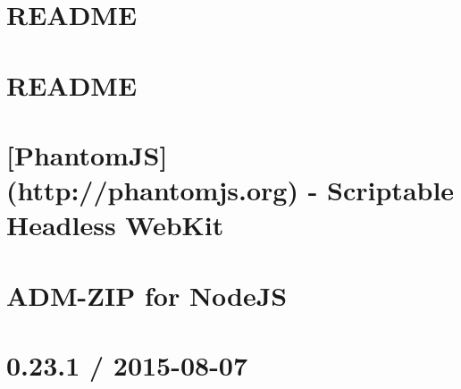 \documentclass[twoside]{book}
\newcommand{\+}{\discretionary{\mbox{\scriptsize$\hookleftarrow$}}{}{}}
\begin{document}
\chapter{R\+E\+A\+D\+M\+E}
\label{md__c_1__users_martin__documents__git_hub_visual_studio__bachelor__wis_r__wis_r_node_modules_gru958568592336ac393a766e6d11e1456e}
\hypertarget{md__c_1__users_martin__documents__git_hub_visual_studio__bachelor__wis_r__wis_r_node_modules_gru958568592336ac393a766e6d11e1456e}{}

\chapter{R\+E\+A\+D\+M\+E}
\label{md__c_1__users_martin__documents__git_hub_visual_studio__bachelor__wis_r__wis_r_node_modules_gruaf25bd9fec8ee0f9ba32e467a9b9580c}
\hypertarget{md__c_1__users_martin__documents__git_hub_visual_studio__bachelor__wis_r__wis_r_node_modules_gruaf25bd9fec8ee0f9ba32e467a9b9580c}{}

\chapter{\mbox{[}Phantom\+J\+S\mbox{]}(http\+://phantomjs.org) -\/ Scriptable Headless Web\+Kit}
\label{md__c_1__users_martin__documents__git_hub_visual_studio__bachelor__wis_r__wis_r_node_modules_grue3a535d45f33ffaaf15e4de745391105}
\hypertarget{md__c_1__users_martin__documents__git_hub_visual_studio__bachelor__wis_r__wis_r_node_modules_grue3a535d45f33ffaaf15e4de745391105}{}

\chapter{A\+D\+M-\/\+Z\+I\+P for Node\+J\+S}
\label{md__c_1__users_martin__documents__git_hub_visual_studio__bachelor__wis_r__wis_r_node_modules_gru93f1704c2f44df11978a5b91304685da}
\hypertarget{md__c_1__users_martin__documents__git_hub_visual_studio__bachelor__wis_r__wis_r_node_modules_gru93f1704c2f44df11978a5b91304685da}{}

\chapter{0.23.1 / 2015-\/08-\/07}
\label{md__c_1__users_martin__documents__git_hub_visual_studio__bachelor__wis_r__wis_r_node_modules_gru8fe5c5556f2d0b2a105db7f6ae89786f}
\hypertarget{md__c_1__users_martin__documents__git_hub_visual_studio__bachelor__wis_r__wis_r_node_modules_gru8fe5c5556f2d0b2a105db7f6ae89786f}{}

\end{document}
